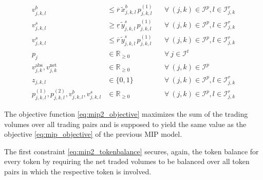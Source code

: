 \documentclass[11pt,parskip=full]{scrartcl}%
\newcommand*{\itokens}{\mathcal{I}^t}       %
\newcommand*{\itokenpairs}{\mathcal{I}^p}   %
\begin{document}
\begin{subequations}
\begin{align}
  \\[1mm]
  v^b_{j,k,l}
  &\le \overline{r} \, \tilde{x}^b_{j,k,l} \, p^{(1)}_{j,k,l}
  && \forall \> (j,k) \in \itokenpairs, l \in \mathcal{I}_{j,k}^r
  \label{eq:mip2_buyvolume_ub}
  \\[1mm]
  v^s_{j,k,l}
  &\ge \underline{r} \, \tilde{y}^s_{j,k,l} \, p^{(1)}_{j,k,l}
  && \forall \> (j,k) \in \itokenpairs, l \in \mathcal{I}_{j,k}^r
  \label{eq:mip2_sellvolume_lb}
  \\[1mm]
  v^s_{j,k,l}
  &\le \overline{r} \, \tilde{y}^s_{j,k,l} \, p^{(1)}_{j,k,l}
  && \forall \> (j,k) \in \itokenpairs, l \in \mathcal{I}_{j,k}^r
  \label{eq:mip2_sellvolume_ub}
  \\[2mm]
  p_j
  &\in \mathbb{R}_{\ge 0}
  && \forall \> j \in \itokens
  \\[1mm]
  v_{j,k}^\mathrm{abs}, v_{j,k}^\mathrm{net}
  &\in \mathbb{R}_{\ge 0}
  && \forall \> (j,k) \in \itokenpairs
  \\[1mm]
  z_{j,k,l}
  &\in \{0,1\}
  && \forall \> (j,k) \in \itokenpairs, l \in \mathcal{I}_{j,k}^r
  \\[1mm]
  p^{(1)}_{j,k,l}, p^{(2)}_{j,k,l}, v^b_{j,k,l}, v^s_{j,k,l}
  &\in \mathbb{R}_{\ge 0}
  && \forall \> (j,k) \in \itokenpairs, l \in \mathcal{I}_{j,k}^r
\end{align}
\label{eq:mip2}
\end{subequations}

The objective function \eqref{eq:mip2_objective} maximizes the sum of the trading volumes over all
trading pairs and is supposed to yield the same value as the objective \eqref{eq:mip_objective} of
the previous MIP model.

The first constraint \eqref{eq:mip2_tokenbalance} secures, again, the token balance for every token
by requiring the net traded volumes to be balanced over all token pairs in which the respective
token is involved.
\end{document}
